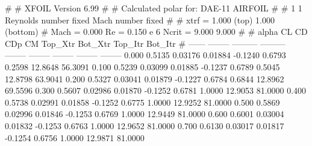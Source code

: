 #  
#       XFOIL         Version 6.99
#  
# Calculated polar for: DAE-11 AIRFOIL                                  
#  
# 1 1 Reynolds number fixed          Mach number fixed         
#  
# xtrf =   1.000 (top)        1.000 (bottom)  
# Mach =   0.000     Re =     0.150 e 6     Ncrit =   9.000  9.000
#  
#   alpha    CL        CD       CDp       CM     Top_Xtr  Bot_Xtr  Top_Itr  Bot_Itr
#  ------ -------- --------- --------- -------- -------- -------- -------- --------
   0.000   0.5135   0.03176   0.01884  -0.1240   0.6793   0.2598  12.8648  56.3091
   0.100   0.5239   0.03099   0.01885  -0.1237   0.6789   0.5045  12.8798  63.9041
   0.200   0.5327   0.03041   0.01879  -0.1227   0.6784   0.6844  12.8962  69.5596
   0.300   0.5607   0.02986   0.01870  -0.1252   0.6781   1.0000  12.9053  81.0000
   0.400   0.5738   0.02991   0.01858  -0.1252   0.6775   1.0000  12.9252  81.0000
   0.500   0.5869   0.02996   0.01846  -0.1253   0.6769   1.0000  12.9449  81.0000
   0.600   0.6001   0.03004   0.01832  -0.1253   0.6763   1.0000  12.9652  81.0000
   0.700   0.6130   0.03017   0.01817  -0.1254   0.6756   1.0000  12.9871  81.0000
